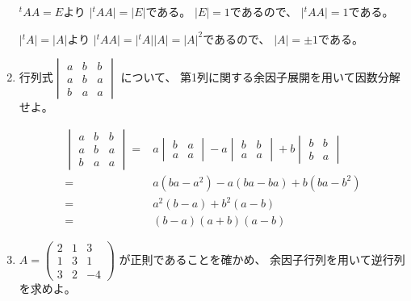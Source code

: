 \documentclass[10pt,a4paper]{ltjsarticle}
\begin{document}
\begin{enumerate}
       \dotfill

       ${}^{t}A A =E$より
       $\lvert {}^{t}A A \rvert = \lvert E \rvert$である。
       $\lvert E \rvert =1$であるので、
       $\lvert {}^{t}A A \rvert = 1$である。

       $\lvert {}^{t}A\rvert = \lvert A \rvert$より
       $\lvert {}^{t}A A \rvert = \lvert {}^{t}A\rvert \lvert A \rvert
       =\lvert A \rvert ^2$であるので、
       $\lvert A \rvert = \pm 1$である。

       \hrulefill
 \item 行列式$\begin{vmatrix} a & b & b\\a & b & a\\b & a & a\end{vmatrix}$
       について、
       第1列に関する余因子展開を用いて因数分解せよ。

       \dotfill

       \begin{align}
        \begin{vmatrix} a & b & b\\a & b & a\\b & a & a\end{vmatrix}
        =&
          a\begin{vmatrix} b & a\\ a & a\end{vmatrix}
        - a\begin{vmatrix} b & b\\ a & a\end{vmatrix}
        + b\begin{vmatrix} b & b\\ b & a\end{vmatrix}\\
        =& a(ba-a^2)-a(ba-ba)+b(ba-b^2)\\
        =& a^2(b-a)+b^2(a-b)\\ 
        =& (b-a)(a+b)(a-b)
       \end{align}
       \hrulefill
 \item $A=\begin{pmatrix} 2 & 1 & 3\\ 1 & 3 & 1\\ 3 & 2 & -4\end{pmatrix}$
       が正則であることを確かめ、
       余因子行列を用いて逆行列を求めよ。

       \dotfill


\end{enumerate}
\end{document}
